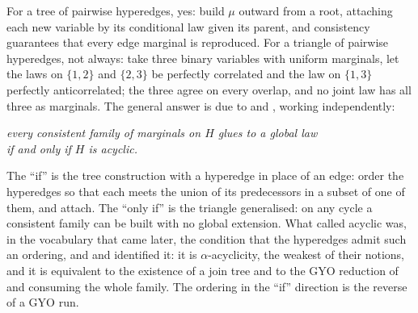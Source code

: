 For a tree of pairwise hyperedges, yes: build $\mu$ outward from a root,
attaching each new variable by its conditional law given its parent, and
consistency guarantees that every edge marginal is reproduced. For a
triangle of pairwise hyperedges, not always: take three binary variables with
uniform marginals, let the laws on $\{1,2\}$ and $\{2,3\}$ be perfectly
correlated and the law on $\{1,3\}$ perfectly anticorrelated; the three
agree on every overlap, and no joint law has all three as marginals. The general answer is due to
\citet{vorobev1962} and \citet{kellerer1964}, working independently:

\begin{center}
\emph{every consistent family of marginals on $H$ glues to a global law\\
if and only if $H$ is acyclic.}
\end{center}

The ``if'' is the tree construction with a hyperedge in place of an edge:
order the hyperedges so that each meets the union of its predecessors in a
subset of one of them, and attach. The ``only if'' is the triangle
generalised: on any cycle a consistent family can be built with no global
extension. What \citeauthor{vorobev1962} called acyclic was, in the
vocabulary that came later, the condition that the hyperedges admit such an
ordering, and \citet{beeri1983} and \citet{fagin1983} identified it: it is
$\alpha$-acyclicity, the weakest of their notions, and it is equivalent to
the existence of a join tree and to the GYO reduction of \citet{graham1979}
and \citet{yu1979} consuming the whole family. The ordering in the ``if''
direction is the reverse of a GYO run.

